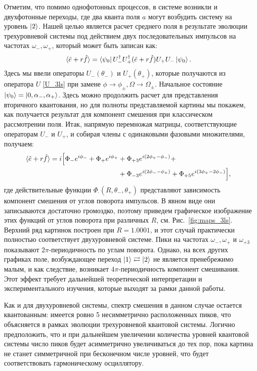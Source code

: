 Отметим, что помимо однофотонных процессов, в системе возникли и двухфотонные переходы, где два кванта поля $a$ могут возбудить систему на уровень $\ket{2}$.
Нашей целью является расчет среднего поля в результате эволюции трехуровневой системы под действием двух последовательных импульсов на частотах $\omega_-, \omega_+$, который может быть записан как:
\begin{equation}
\braket{\hat{e} + r\hat{f}} = \bra{\psi_0}U^\dagger_-U^\dagger_+(\hat{e} + r\hat{f})U_+U_-\ket{\psi_0}.
\end{equation}
Здесь мы ввели операторы $U_-(\theta_-)$ и $U_+(\theta_+)$, которые получаются из оператора $U$ \eqref{U_3ls} при замене $\phi \rightarrow \phi_{\pm}, \Omega \rightarrow \Omega_{\pm}$. Начальное состояние $\ket{\psi_0} = \ket{0,\alpha_-, \alpha_+}$. Здесь можно продолжить расчет для представления вторичного квантования, но для полноты представляемой картины мы покажем, как получается результат для компонент смешения при классическом рассмотрении поля. Итак, напрямую перемножая матрицы, соответствующие операторам $U_-$ и $U_+$, и собирая члены с одинаковыми фазовыми множителями, получаем:
\begin{equation}
	\begin{split}
	\braket{\hat{e}+r\hat{f}} = i\Big[\Phi_- e^{i \phi _-} + \Phi_+ e^{i \phi _+} &+ \Phi_{+3}e^{i \left(2 \phi _+ -\phi_- \right)} +\\&+ \Phi_{-3}e^{i(2 \phi _-- \phi _+)} + \Phi_{+5}e^{i(3 \phi _+-2 \phi _-)}\Big],
	\end{split}
\end{equation}
где действительные функции $\Phi_{\cdot}(R, \theta_-, \theta_+)$ представляют зависимость компонент смешения от углов поворота импульсов. В явном виде они записываются достаточно громоздко, поэтому приведем графическое изображение этих функций от углов поворота при различных $R$, см. Рис.~\ref{fig:maps_3ls}. Верхний ряд картинок построен при $R=1.0001$, и этот случай практически полностью соответствует двухуровневой системе. Пики на частотах $\omega_-, \omega_+ \text{ и } \omega_{+3}$ показывают $2\pi$-периодичность по углам поворота. Однако, на всех других графиках поле, возбуждающее переход $\ket{1}\rightleftarrows\ket{2}$ не является пренебрежимо малым, и как следствие, возникает $4\pi$-периодичность компонент смешивания. Этот эффект требует дальнейшей теоретической интерпретации и экспериментального изучения, которые выходят за рамки данной работы. 

Как и для двухуровневой системы, спектр смешения в данном случае остается квантованным: имеется ровно 5 несимметрично расположенных пиков, что объясняется в рамках эволюции трехуровневой квантовой системы. Логично предположить, что и при дальнейшем увеличении количества уровней квантовой системы число пиков будет асимметрично увеличиваться до тех пор, пока картина не станет симметричной при бесконечном числе уровней, что будет соответствовать гармоническому осциллятору.
